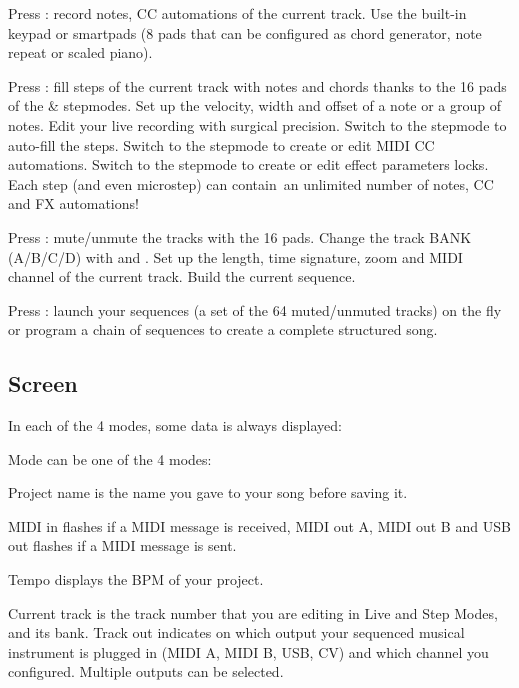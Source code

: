 Press : record notes, CC automations of the current track. Use the built-in keypad or smartpads (8 pads that can be configured as chord generator, note repeat or scaled piano).


Press : fill steps of the current track with notes and chords thanks to the 16 pads of the  \&  stepmodes. Set up the velocity, width and offset of a note or a group of notes. Edit your live recording with surgical precision. Switch to the  stepmode to auto-fill the steps. Switch to the  stepmode to create or edit MIDI CC automations. Switch to the  stepmode to create or edit effect parameters locks. Each step (and even microstep) can contain an unlimited number of notes, CC and FX automations!


Press : mute/unmute the tracks with the 16 pads. Change the track BANK (A/B/C/D) with \btn{<} and \btn{>}. Set up the length, time signature, zoom and MIDI channel of the current track. Build the current sequence.


Press : launch your sequences (a set of the 64 muted/unmuted tracks) on the fly or program a chain of sequences to create a complete structured song.



\subsection{Screen}

In each of the 4 modes, some data is always displayed:


\textcolor{pygreen}{Mode} can be one of the 4 modes:    

\textcolor{pygreen}{Project name} is the name you gave to your song before saving it.

\textcolor{pygreen}{MIDI in} flashes if a MIDI message is received, \textcolor{pygreen}{MIDI out A}, \textcolor{pygreen}{MIDI out B} and \textcolor{pygreen}{USB out} flashes if a MIDI message is sent.

\textcolor{pygreen}{Tempo} displays the BPM of your project.

\textcolor{pyred}{Current track} is the track number that you are editing in Live and Step Modes, and its bank. \textcolor{pyred}{Track out} indicates on which output your sequenced musical instrument is plugged in (MIDI A, MIDI B, USB, CV) and which channel you configured. Multiple outputs can be selected.

